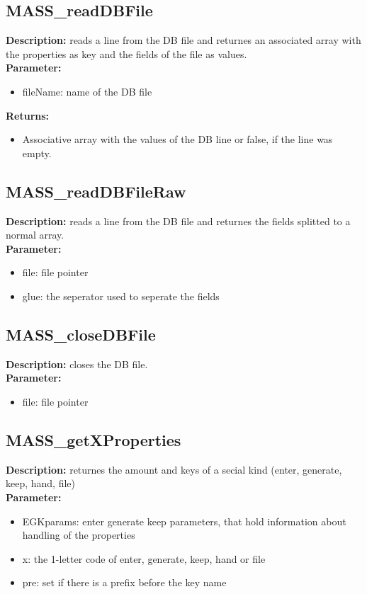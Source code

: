 \subsection{MASS\_readDBFile}
\textbf{Description:} reads a line from the DB file and returnes an associated array with the properties as key and the fields of the file as values.\\
\textbf{Parameter:}
\begin{itemize}
\item fileName: name of the DB file
\end{itemize}
\textbf{Returns:}
\begin{itemize}
\item Associative array with the values of the DB line or false, if the line was empty.
\end{itemize}

\subsection{MASS\_readDBFileRaw}
\textbf{Description:} reads a line from the DB file and returnes the fields splitted to a normal array.\\
\textbf{Parameter:}
\begin{itemize}
\item file: file pointer
\item glue: the seperator used to seperate the fields
\end{itemize}

\subsection{MASS\_closeDBFile}
\textbf{Description:} closes the DB file.\\
\textbf{Parameter:}
\begin{itemize}
\item file: file pointer
\end{itemize}

\subsection{MASS\_getXProperties}
\textbf{Description:} returnes the amount and keys of a secial kind (enter, generate, keep, hand, file)\\
\textbf{Parameter:}
\begin{itemize}
\item EGKparams: enter generate keep parameters, that hold information about handling of the properties
\item x: the 1-letter code of enter, generate, keep, hand or file
\item pre: set if there is a prefix before the key name
\end{itemize}

